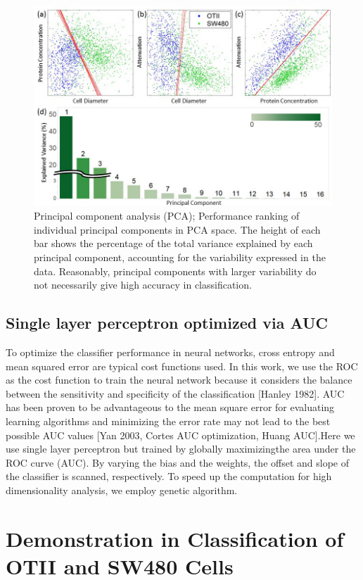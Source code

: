 \documentclass[aps,pra,reprint,superscriptaddress]{revtex4-1}
\begin{document}
\begin{figure}
\includegraphics[scale=0.55]{FigurePCA.jpg}
\caption{\label{fig:PCA} Principal component analysis (PCA); Performance ranking of individual principal components in PCA space. The height of each bar shows the percentage of the total variance explained by each principal component, accounting for the variability expressed in the data. Reasonably, principal components with larger variability do not necessarily give high accuracy in classification.}
\end{figure}

\subsection{Single layer perceptron optimized via AUC}

To optimize the classifier performance in neural networks, cross entropy and mean squared error are typical cost functions used. In this work, we use the ROC as the cost function to train the neural network because it considers the balance between the sensitivity and specificity of the classification [Hanley 1982]. AUC has been proven to be advantageous to the mean square error for evaluating learning algorithms \cite{verrelst1998use} and minimizing the error rate may not lead to the best possible AUC values [Yan 2003, Cortes AUC optimization, Huang AUC].Here we use single layer perceptron but trained by globally maximizingthe area under the ROC curve (AUC). By varying the bias and the weights, the offset and slope of the classifier is scanned, respectively. To speed up the computation for high dimensionality analysis, we employ genetic algorithm. 

\section{Demonstration in Classification of OTII and SW480 Cells}
\end{document}
